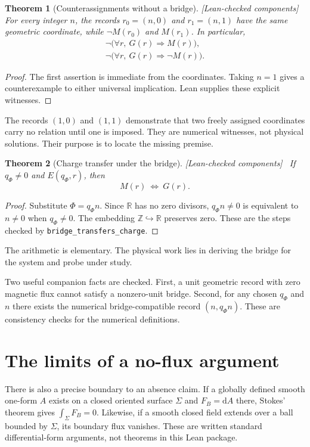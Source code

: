 \documentclass[11pt]{article}
\newtheorem{theorem}{Theorem}[section]
\theoremstyle{definition}\newtheorem{definition}[theorem]{Definition}
\theoremstyle{remark}\newtheorem{remark}[theorem]{Remark}
\newcommand{\dd}{\mathrm{d}}
\newcommand{\R}{\mathbb{R}}
\newcommand{\Z}{\mathbb{Z}}
\newcommand{\checked}{\textnormal{\small[Lean-checked components]}\ }
\begin{document}
\begin{theorem}[Counterassignments without a bridge]\label{thm:counter}\checked
For every integer $n$, the records $r_0=(n,0)$ and $r_1=(n,1)$ have the same geometric coordinate, while $\neg M(r_0)$ and $M(r_1)$. In particular,
\begin{align}
 \neg\bigl(\forall r,\ G(r)\Rightarrow M(r)\bigr),\\
 \neg\bigl(\forall r,\ G(r)\Rightarrow\neg M(r)\bigr).
\end{align}
\end{theorem}
\begin{proof}
The first assertion is immediate from the coordinates. Taking $n=1$ gives a counterexample to either universal implication. Lean supplies these explicit witnesses.
\end{proof}
The records $(1,0)$ and $(1,1)$ demonstrate that two freely assigned coordinates carry no relation until one is imposed. They are numerical witnesses, not physical solutions. Their purpose is to locate the missing premise.

\begin{theorem}[Charge transfer under the bridge]\label{thm:transfer}\checked
If $q_\Phi\neq0$ and $E(q_\Phi,r)$, then
\hypertarget{eq:iff}{}
\begin{equation}
 M(r)\ \Longleftrightarrow\ G(r).
\end{equation}
\end{theorem}
\begin{proof}
Substitute $\Phi=q_\Phi n$. Since $\R$ has no zero divisors, $q_\Phi n\neq0$ is equivalent to $n\neq0$ when $q_\Phi\neq0$. The embedding $\Z\hookrightarrow\R$ preserves zero. These are the steps checked by \texttt{bridge\_transfers\_charge}.
\end{proof}
The arithmetic is elementary. The physical work lies in deriving the bridge for the system and probe under study.

Two useful companion facts are checked. First, a unit geometric record with zero magnetic flux cannot satisfy a nonzero-unit bridge. Second, for any chosen $q_\Phi$ and $n$ there exists the numerical bridge-compatible record $(n,q_\Phi n)$. These are consistency checks for the numerical definitions.

\section{The limits of a no-flux argument}
There is also a precise boundary to an absence claim. If a globally defined smooth one-form $A$ exists on a closed oriented surface $\Sigma$ and $F_B=\dd A$ there, Stokes' theorem gives $\int_\Sigma F_B=0$. Likewise, if a smooth closed field extends over a ball bounded by $\Sigma$, its boundary flux vanishes. These are written standard differential-form arguments, not theorems in this Lean package.
\end{document}
